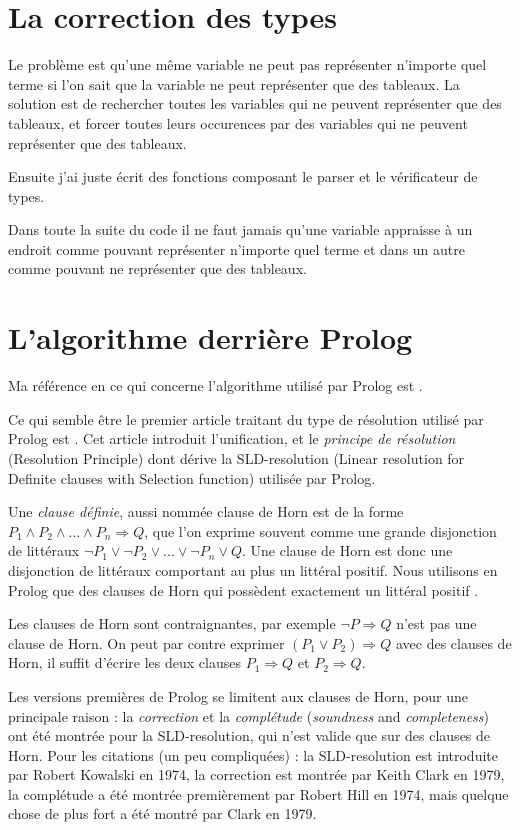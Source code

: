 \documentclass{article}
\begin{document}
\section{La correction des types}

Le problème est qu'une même variable ne peut pas représenter n'importe quel terme si l'on sait que la variable ne peut représenter que des tableaux. La solution est de rechercher toutes les variables qui ne peuvent représenter que des tableaux, et forcer toutes leurs occurences par des variables qui ne peuvent représenter que des tableaux.

Ensuite j'ai juste écrit des fonctions composant le parser et le vérificateur de types.

Dans toute la suite du code il ne faut jamais qu'une variable appraisse à un endroit comme pouvant représenter n'importe quel terme et dans un autre comme pouvant ne représenter que des tableaux.



\section{L'algorithme derrière Prolog}

Ma référence en ce qui concerne l'algorithme utilisé par Prolog est \cite{NilssonMaluszynski}.

Ce qui semble être le premier article traitant du type de résolution utilisé par Prolog est \cite{Robinson}. Cet article introduit l'unification, et le \emph{principe de résolution} (Resolution Principle) dont dérive la SLD-resolution (Linear resolution for Definite clauses with Selection function) utilisée par Prolog.

Une \emph{clause définie}, aussi nommée clause de Horn est de la forme $P_1 \land P_2 \land ... \land P_n \Rightarrow Q$, que l'on exprime souvent comme une grande disjonction de littéraux $\neg P_1 \lor \neg P_2 \lor ... \lor \neg P_n \lor Q$. Une clause de Horn est donc une disjonction de littéraux comportant au plus un littéral positif. Nous utilisons en Prolog que des clauses de Horn qui possèdent exactement un littéral positif .

Les clauses de Horn sont contraignantes, par exemple $\neg P \Rightarrow Q$ n'est pas une clause de Horn. On peut par contre exprimer $(P_1 \lor P_2) \Rightarrow Q$ avec des clauses de Horn, il suffit d'écrire les deux clauses $P_1 \Rightarrow Q$ et $P_2 \Rightarrow Q$.

Les versions premières de Prolog se limitent aux clauses de Horn, pour une principale raison : la \emph{correction} et la \emph{complétude} (\emph{soundness} and \emph{completeness}) ont été montrée pour la SLD-resolution, qui n'est valide que sur des clauses de Horn. Pour les citations (un peu compliquées) : la SLD-resolution est introduite par Robert Kowalski en 1974, la correction est montrée par Keith Clark en 1979, la complétude a été montrée premièrement par Robert Hill en 1974, mais quelque chose de plus fort a été montré par Clark en 1979.
\end{document}

